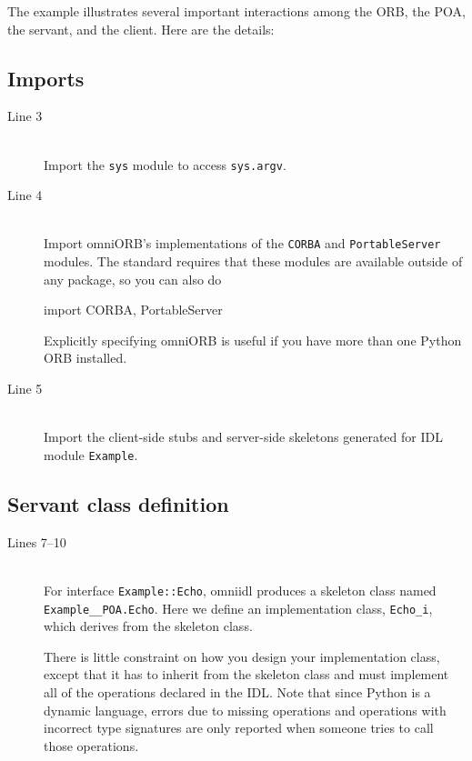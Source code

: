 \documentclass[11pt,twoside,a4paper]{book}
\newcommand{\type}[1]{\texttt{#1}}
\newcommand{\intf}[1]{\texttt{#1}}
\newcommand{\module}[1]{\texttt{#1}}
\newcommand{\code}[1]{\texttt{#1}}
\begin{document}
The example illustrates several important interactions among the ORB,
the POA, the servant, and the client. Here are the details:

\subsection{Imports}

\begin{description}

\item[Line 3]\mbox{}\\
%
Import the \module{sys} module to access \code{sys.argv}.

\item[Line 4]\mbox{}\\
%
Import omniORB's implementations of the \module{CORBA} and
\module{PortableServer} modules. The standard requires that these
modules are available outside of any package, so you can also do

\begin{pylisting}
import CORBA, PortableServer
\end{pylisting}

\noindent Explicitly specifying omniORB is useful if you have more
than one Python ORB installed.

\item[Line 5]\mbox{}\\
%
Import the client-side stubs and server-side skeletons generated for
IDL module \module{Example}.

\end{description}


\subsection{Servant class definition}

\begin{description}

\item[Lines 7--10]\mbox{}\\
%
For interface \intf{Example::Echo}, omniidl produces a skeleton class
named \type{Example\_\_POA.Echo}. Here we define an implementation
class, \type{Echo\_i}, which derives from the skeleton class.

There is little constraint on how you design your implementation
class, except that it has to inherit from the skeleton class and must
implement all of the operations declared in the IDL. Note that since
Python is a dynamic language, errors due to missing operations and
operations with incorrect type signatures are only reported when
someone tries to call those operations.

\end{description}
\end{document}

